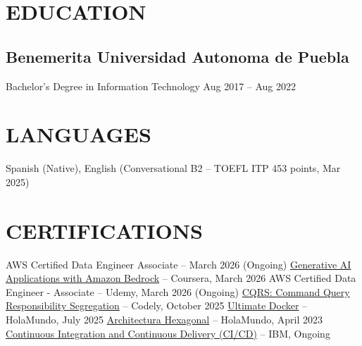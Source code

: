\documentclass[a4paper,10pt]{article}
\begin{document}
\section*{EDUCATION}

\subsection*{\small Benemerita Universidad Autonoma de Puebla}
Bachelor's Degree in Information Technology \hfill Aug 2017 -- Aug 2022

\section*{LANGUAGES}
Spanish (Native), English (Conversational B2 -- TOEFL ITP 453 points, Mar 2025)

\section*{CERTIFICATIONS}
AWS Certified Data Engineer Associate -- March 2026 (Ongoing)
    \href{https://coursera.org/verify/HEG7YFDO6D1C}{Generative AI Applications with Amazon Bedrock} -- Coursera, March 2026
    AWS Certified Data Engineer - Associate -- Udemy, March 2026 (Ongoing)
    \href{https://www.linkedin.com/in/jose-carlos-huerta-garcia-773952212/details/certifications}{CQRS: Command Query Responsibility Segregation} -- Codely, October 2025
    \href{https://academia.holamundo.io/certificates/fifvbfywmp}{Ultimate Docker} -- HolaMundo, July 2025
    \href{https://www.linkedin.com/in/jose-carlos-huerta-garcia-773952212/details/certifications/1758852008410/single-media-viewer/?profileId=ACoAADXjsscBqtjtdk4S_qpdkHwZs, Fn9y9TiG0o}{Architectura Hexagonal} -- HolaMundo, April 2023
    \href{https://www.coursera.org/programs/knu-high-o3k80/learn/continuous-integration-and-continuous-delivery-ci-cd?source=search}{Continuous Integration and Continuous Delivery (CI/CD)} -- IBM, Ongoing
\end{document}
